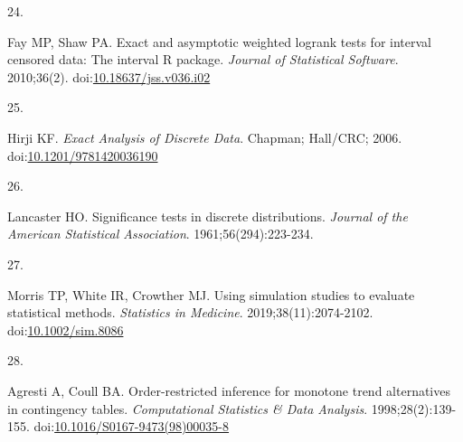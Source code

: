 \documentclass[
  11pt,
]{article}
\newlength{\cslhangindent}
\newlength{\csllabelwidth}
\newenvironment{CSLReferences}[2] %
 {\begin{list}{}{%
  \setlength{\itemindent}{0pt}
  \setlength{\leftmargin}{0pt}
  \setlength{\parsep}{0pt}
  \ifodd #1
   \setlength{\leftmargin}{\cslhangindent}
   \setlength{\itemindent}{-1\cslhangindent}
  \fi
  \setlength{\itemsep}{#2\baselineskip}}}
 {\end{list}}
\newcommand{\CSLLeftMargin}[1]{\parbox[t]{\csllabelwidth}{\strut#1\strut}}
\newcommand{\CSLRightInline}[1]{\parbox[t]{\linewidth - \csllabelwidth}{\strut#1\strut}}
\begin{document}
\begin{CSLReferences}{0}{1}
\CSLLeftMargin{24. }%
\CSLRightInline{Fay MP, Shaw PA. Exact and asymptotic weighted logrank tests for interval censored data: The {interval} {R} package. \emph{Journal of Statistical Software}. 2010;36(2). doi:\href{https://doi.org/10.18637/jss.v036.i02}{10.18637/jss.v036.i02}}

\CSLLeftMargin{25. }%
\CSLRightInline{Hirji KF. \emph{Exact Analysis of Discrete Data}. Chapman; Hall/CRC; 2006. doi:\href{https://doi.org/10.1201/9781420036190}{10.1201/9781420036190}}

\CSLLeftMargin{26. }%
\CSLRightInline{Lancaster HO. Significance tests in discrete distributions. \emph{Journal of the American Statistical Association}. 1961;56(294):223-234.}

\CSLLeftMargin{27. }%
\CSLRightInline{Morris TP, White IR, Crowther MJ. Using simulation studies to evaluate statistical methods. \emph{Statistics in Medicine}. 2019;38(11):2074-2102. doi:\href{https://doi.org/10.1002/sim.8086}{10.1002/sim.8086}}

\CSLLeftMargin{28. }%
\CSLRightInline{Agresti A, Coull BA. Order-restricted inference for monotone trend alternatives in contingency tables. \emph{Computational Statistics \& Data Analysis}. 1998;28(2):139-155. doi:\href{https://doi.org/10.1016/S0167-9473(98)00035-8}{10.1016/S0167-9473(98)00035-8}}

\end{CSLReferences}
\end{document}
